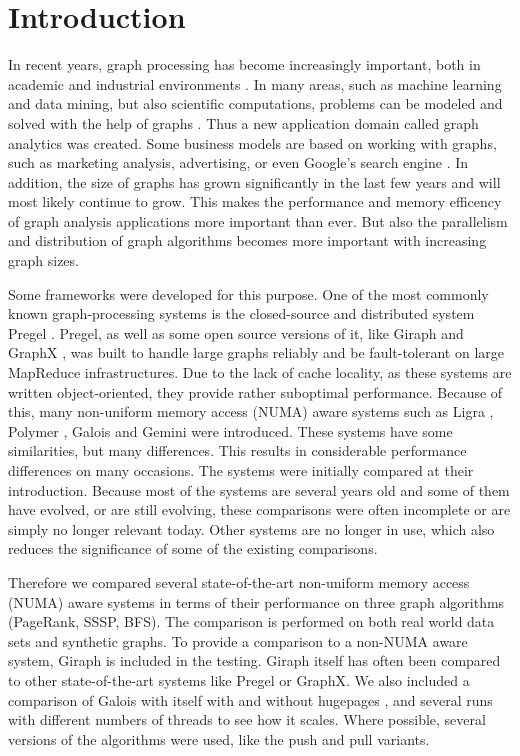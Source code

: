 \section{Introduction}

In recent years, graph processing has become increasingly important, both in academic and industrial environments \cite{Gemini}.
In many areas, such as machine learning and data mining, but also scientific computations, problems can be modeled and solved with the help of graphs \cite{Polymer}.
Thus a new application domain called graph analytics was created.
Some business models are based on working with graphs, such as marketing analysis, advertising, or even Google's search engine \cite{pagerank}.
In addition, the size of graphs has grown significantly in the last few years and will most likely continue to grow.
This makes the performance and memory efficency of graph analysis applications more important than ever.
But also the parallelism and distribution of graph algorithms becomes more important with increasing graph sizes.

Some frameworks were developed for this purpose.
One of the most commonly known graph-processing systems is the closed-source and distributed system Pregel \cite{pregel}.
Pregel, as well as some open source versions of it, like Giraph \cite{Giraph} and GraphX \cite{graphx}, was built to handle large graphs reliably and be fault-tolerant on large MapReduce infrastructures.
Due to the lack of cache locality, as these systems are written object-oriented, they provide rather suboptimal performance.
Because of this, many non-uniform memory access (NUMA) aware systems such as Ligra \cite{Ligra}, Polymer \cite{Polymer}, Galois \cite{Galois} and Gemini \cite{Gemini} were introduced.
These systems have some similarities, but many differences. This results in considerable performance differences on many occasions.
The systems were initially compared at their introduction.
Because most of the systems are several years old and some of them have evolved, or are still evolving, these comparisons were often incomplete or are simply no longer relevant today. 
Other systems are no longer in use, which also reduces the significance of some of the existing comparisons.

Therefore we compared several state-of-the-art non-uniform memory access (NUMA) aware systems in terms of their performance on three graph algorithms (PageRank, SSSP, BFS).
The comparison is performed on both real world data sets and synthetic graphs.
To provide a comparison to a non-NUMA aware system, Giraph is included in the testing.
Giraph itself has often been compared to other state-of-the-art systems like Pregel or GraphX.
We also included a comparison of Galois with itself with and without hugepages \cite{hugepages}, and several runs with different numbers of threads to see how it scales.
Where possible, several versions of the algorithms were used, like the push and pull variants.

